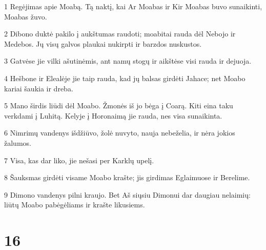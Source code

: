 \par 1 Regėjimas apie Moabą. Tą naktį, kai Ar Moabas ir Kir Moabas buvo sunaikinti, Moabas žuvo. 
\par 2 Dibono duktė pakilo į aukštumas raudoti; moabitai rauda dėl Nebojo ir Medebos. Jų visų galvos plaukai nukirpti ir barzdos nuskustos. 
\par 3 Gatvėse jie vilki ašutinėmis, ant namų stogų ir aikštėse visi rauda ir dejuoja. 
\par 4 Hešbone ir Elealėje jie taip rauda, kad jų balsas girdėti Jahace; net Moabo kariai šaukia ir dreba. 
\par 5 Mano širdis liūdi dėl Moabo. Žmonės iš jo bėga į Coarą. Kiti eina taku verkdami į Luhitą. Kelyje į Horonaimą jie rauda, nes visa sunaikinta. 
\par 6 Nimrimų vandenys išdžiūvo, žolė nuvyto, nauja nebeželia, ir nėra jokios žalumos. 
\par 7 Visa, kas dar liko, jie nešasi per Karklų upelį. 
\par 8 Šauksmas girdėti visame Moabo krašte; jis girdimas Eglaimuose ir Berelime. 
\par 9 Dimono vandenys pilni kraujo. Bet Aš siųsiu Dimonui dar daugiau nelaimių: liūtų Moabo pabėgėliams ir krašte likusiems.



\chapter{16}


